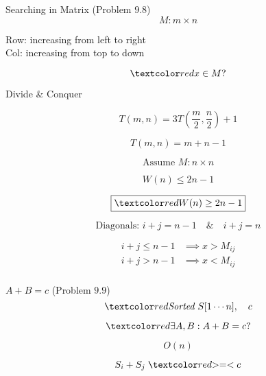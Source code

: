 \begin{frame}{}
  \begin{exampleblock}{Searching in Matrix (Problem $9.8$)}
    \[
      M: m \times n
    \]

    \begin{center}
      {Row: increasing from left to right} \\[6pt]
      {Col: increasing from top to down}
    \end{center}

    \vspace{-0.50cm}
    \[
      \red{x \in M?}
    \]
  \end{exampleblock}

  \pause
  \vspace{0.30cm}
  \centerline{Divide \& Conquer}

  \pause
  \[
    T(m,n) = 3T(\frac{m}{2}, \frac{n}{2}) + 1 
  \]


  \pause
  \vspace{0.30cm}
  \centerline{}

  \pause
  \[
    T(m, n) = m + n - 1
  \]
\end{frame}

\begin{frame}{}
  \[
    \text{Assume } M: n \times n 
  \]

  \[
    W(n) \le 2n - 1
  \]

  \pause
  \[
    \boxed{\red{W(n) \ge 2n - 1}}
  \]

  \pause
  \centerline{}

  \pause
  \[
    \text{Diagonals: } i + j = n - 1 \quad\&\quad i + j = n
  \]

  \pause
  \centerline{}

  \pause
  \begin{align*}
    i + j \le n - 1 &\implies x > M_{ij} \\
    i + j > n - 1 &\implies x < M_{ij} \\
  \end{align*}
\end{frame}

\begin{frame}{}
  \begin{exampleblock}{$A + B = c$ (Problem $9.9$)}
    \[
      \red{\text{\it Sorted }} S[1 \cdots n], \quad c
    \]

    \[
      \red{\exists A, B: A + B = c?}
    \]

    \[
      O(n)
    \]
  \end{exampleblock}

  \pause
  \vspace{0.50cm}
  \centerline{}

  \[
    S_i + S_j \;\red{>=<}\; c
  \]
\end{frame}

